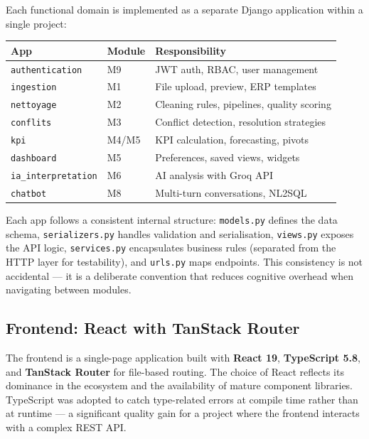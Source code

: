 \vspace{0.4cm}
\noindent
Each functional domain is implemented as a separate
Django application within a single project:

\begin{center}
\begin{tabular}{|l|l|l|}
\hline
\textbf{App} & \textbf{Module} & \textbf{Responsibility} \\
\hline
\texttt{authentication} & M9 & JWT auth, RBAC, user management \\
\texttt{ingestion} & M1 & File upload, preview, ERP templates \\
\texttt{nettoyage} & M2 & Cleaning rules, pipelines, quality scoring \\
\texttt{conflits} & M3 & Conflict detection, resolution strategies \\
\texttt{kpi} & M4/M5 & KPI calculation, forecasting, pivots \\
\texttt{dashboard} & M5 & Preferences, saved views, widgets \\
\texttt{ia\_interpretation} & M6 & AI analysis with Groq API \\
\texttt{chatbot} & M8 & Multi-turn conversations, NL2SQL \\
\hline
\end{tabular}
\end{center}

\vspace{0.4cm}
\noindent
Each app follows a consistent internal structure:
\texttt{models.py} defines the data schema,
\texttt{serializers.py} handles validation and serialisation,
\texttt{views.py} exposes the API logic,
\texttt{services.py} encapsulates business rules
(separated from the HTTP layer for testability),
and \texttt{urls.py} maps endpoints.
This consistency is not accidental — it is a deliberate
convention that reduces cognitive overhead
when navigating between modules.

\subsection{Frontend: React with TanStack Router}

\noindent
The frontend is a single-page application built with
\textbf{React 19}, \textbf{TypeScript 5.8},
and \textbf{TanStack Router} for file-based routing.
The choice of React reflects its dominance in the
ecosystem and the availability of mature component libraries.
TypeScript was adopted to catch type-related errors
at compile time rather than at runtime —
a significant quality gain for a project
where the frontend interacts with a complex REST API.

